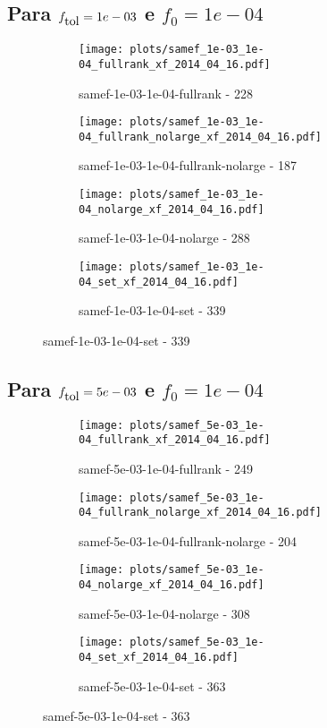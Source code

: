 \newpage
\subsection{Para $f_{\mbox{tol}} = 1e-03$ e $f_0 = 1e-04$}

\begin{figure}[H]
  \centering
  \begin{subfigure}{0.48\textwidth}
    \texttt{[image: plots/samef\_1e-03\_1e-04\_fullrank\_xf\_2014\_04\_16.pdf]}
    \caption{samef-1e-03-1e-04-fullrank - 228}
  \end{subfigure}
  \begin{subfigure}{0.48\textwidth}
    \texttt{[image: plots/samef\_1e-03\_1e-04\_fullrank\_nolarge\_xf\_2014\_04\_16.pdf]}
    \caption{samef-1e-03-1e-04-fullrank-nolarge - 187}
  \end{subfigure}
  \begin{subfigure}{0.48\textwidth}
    \texttt{[image: plots/samef\_1e-03\_1e-04\_nolarge\_xf\_2014\_04\_16.pdf]}
    \caption{samef-1e-03-1e-04-nolarge - 288}
  \end{subfigure}
  \begin{subfigure}{0.48\textwidth}
    \texttt{[image: plots/samef\_1e-03\_1e-04\_set\_xf\_2014\_04\_16.pdf]}
    \caption{samef-1e-03-1e-04-set - 339}
  \end{subfigure}
\end{figure}

\newpage
\subsection{Para $f_{\mbox{tol}} = 5e-03$ e $f_0 = 1e-04$}

\begin{figure}[H]
  \centering
  \begin{subfigure}{0.48\textwidth}
    \texttt{[image: plots/samef\_5e-03\_1e-04\_fullrank\_xf\_2014\_04\_16.pdf]}
    \caption{samef-5e-03-1e-04-fullrank - 249}
  \end{subfigure}
  \begin{subfigure}{0.48\textwidth}
    \texttt{[image: plots/samef\_5e-03\_1e-04\_fullrank\_nolarge\_xf\_2014\_04\_16.pdf]}
    \caption{samef-5e-03-1e-04-fullrank-nolarge - 204}
  \end{subfigure}
  \begin{subfigure}{0.48\textwidth}
    \texttt{[image: plots/samef\_5e-03\_1e-04\_nolarge\_xf\_2014\_04\_16.pdf]}
    \caption{samef-5e-03-1e-04-nolarge - 308}
  \end{subfigure}
  \begin{subfigure}{0.48\textwidth}
    \texttt{[image: plots/samef\_5e-03\_1e-04\_set\_xf\_2014\_04\_16.pdf]}
    \caption{samef-5e-03-1e-04-set - 363}
  \end{subfigure}
\end{figure}

